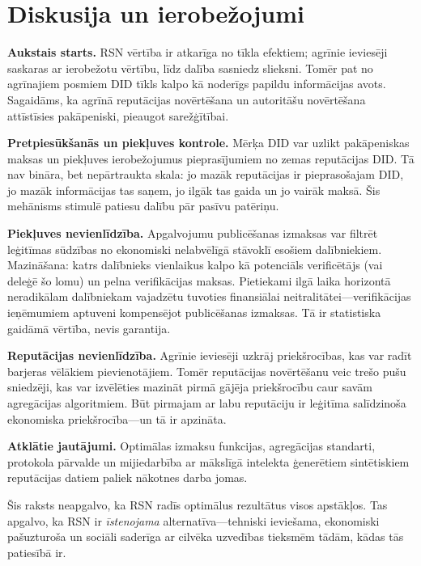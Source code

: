\documentclass[11pt,a4paper,twocolumn]{article}
\begin{document}
\section{Diskusija un ierobežojumi}

\textbf{Aukstais starts.} RSN vērtība ir atkarīga no tīkla efektiem; agrīnie ieviesēji saskaras ar ierobežotu vērtību, līdz dalība sasniedz slieksni. Tomēr pat no agrīnajiem posmiem DID tīkls kalpo kā noderīgs papildu informācijas avots. Sagaidāms, ka agrīnā reputācijas novērtēšana un autoritāšu novērtēšana attīstīsies pakāpeniski, pieaugot sarežģītībai.

\textbf{Pretpiesūkšanās un piekļuves kontrole.} Mērķa DID var uzlikt pakāpeniskas maksas un piekļuves ierobežojumus pieprasījumiem no zemas reputācijas DID. Tā nav bināra, bet nepārtraukta skala: jo mazāk reputācijas ir pieprasošajam DID, jo mazāk informācijas tas saņem, jo ilgāk tas gaida un jo vairāk maksā. Šis mehānisms stimulē patiesu dalību pār pasīvu patēriņu.

\textbf{Piekļuves nevienlīdzība.} Apgalvojumu publicēšanas izmaksas var filtrēt leģitīmas sūdzības no ekonomiski nelabvēlīgā stāvoklī esošiem dalībniekiem. Mazināšana: katrs dalībnieks vienlaikus kalpo kā potenciāls verificētājs (vai deleģē šo lomu) un pelna verifikācijas maksas. Pietiekami ilgā laika horizontā neradikālam dalībniekam vajadzētu tuvoties finansiālai neitralitātei---verifikācijas ieņēmumiem aptuveni kompensējot publicēšanas izmaksas. Tā ir statistiska gaidāmā vērtība, nevis garantija.

\textbf{Reputācijas nevienlīdzība.} Agrīnie ieviesēji uzkrāj priekšrocības, kas var radīt barjeras vēlākiem pievienotājiem. Tomēr reputācijas novērtēšanu veic trešo pušu sniedzēji, kas var izvēlēties mazināt pirmā gājēja priekšrocību caur savām agregācijas algoritmiem. Būt pirmajam ar labu reputāciju ir leģitīma salīdzinoša ekonomiska priekšrocība---un tā ir apzināta.

\textbf{Atklātie jautājumi.} Optimālas izmaksu funkcijas, agregācijas standarti, protokola pārvalde un mijiedarbība ar mākslīgā intelekta ģenerētiem sintētiskiem reputācijas datiem paliek nākotnes darba jomas.

Šis raksts neapgalvo, ka RSN radīs optimālus rezultātus visos apstākļos. Tas apgalvo, ka RSN ir \emph{īstenojama} alternatīva---tehniski ieviešama, ekonomiski paš\-uzturoša un sociāli saderīga ar cilvēka uzvedības tieksmēm tādām, kādas tās patiesībā ir.

\end{document}

